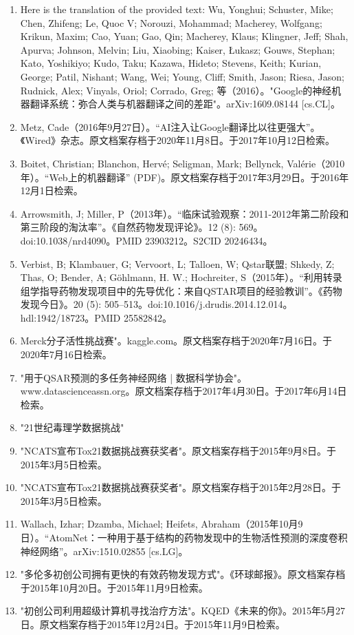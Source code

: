 \begin{enumerate}
\item Here is the translation of the provided text:
Wu, Yonghui; Schuster, Mike; Chen, Zhifeng; Le, Quoc V; Norouzi, Mohammad; Macherey, Wolfgang; Krikun, Maxim; Cao, Yuan; Gao, Qin; Macherey, Klaus; Klingner, Jeff; Shah, Apurva; Johnson, Melvin; Liu, Xiaobing; Kaiser, Łukasz; Gouws, Stephan; Kato, Yoshikiyo; Kudo, Taku; Kazawa, Hideto; Stevens, Keith; Kurian, George; Patil, Nishant; Wang, Wei; Young, Cliff; Smith, Jason; Riesa, Jason; Rudnick, Alex; Vinyals, Oriol; Corrado, Greg; 等（2016）。"Google的神经机器翻译系统：弥合人类与机器翻译之间的差距"。arXiv:1609.08144 [cs.CL]。
\item Metz, Cade（2016年9月27日）。“AI注入让Google翻译比以往更强大”。《Wired》杂志。原文档案存档于2020年11月8日。于2017年10月12日检索。
\item Boitet, Christian; Blanchon, Hervé; Seligman, Mark; Bellynck, Valérie（2010年）。“Web上的机器翻译” (PDF)。原文档案存档于2017年3月29日。于2016年12月1日检索。
\item Arrowsmith, J; Miller, P（2013年）。“临床试验观察：2011-2012年第二阶段和第三阶段的淘汰率”。《自然药物发现评论》。12 (8): 569。doi:10.1038/nrd4090。PMID 23903212。S2CID 20246434。
\item Verbist, B; Klambauer, G; Vervoort, L; Talloen, W; Qstar联盟; Shkedy, Z; Thas, O; Bender, A; Göhlmann, H. W.; Hochreiter, S（2015年）。“利用转录组学指导药物发现项目中的先导优化：来自QSTAR项目的经验教训”。《药物发现今日》。20 (5): 505–513。doi:10.1016/j.drudis.2014.12.014。hdl:1942/18723。PMID 25582842。
\item Merck分子活性挑战赛"。kaggle.com。原文档案存档于2020年7月16日。于2020年7月16日检索。
\item "用于QSAR预测的多任务神经网络 | 数据科学协会"。www.datascienceassn.org。原文档案存档于2017年4月30日。于2017年6月14日检索。
\item "21世纪毒理学数据挑战"
\item "NCATS宣布Tox21数据挑战赛获奖者"。原文档案存档于2015年9月8日。于2015年3月5日检索。
\item "NCATS宣布Tox21数据挑战赛获奖者"。原文档案存档于2015年2月28日。于2015年3月5日检索。
\item Wallach, Izhar; Dzamba, Michael; Heifets, Abraham（2015年10月9日）。“AtomNet：一种用于基于结构的药物发现中的生物活性预测的深度卷积神经网络”。arXiv:1510.02855 [cs.LG]。
\item "多伦多初创公司拥有更快的有效药物发现方式"。《环球邮报》。原文档案存档于2015年10月20日。于2015年11月9日检索。
\item "初创公司利用超级计算机寻找治疗方法"。KQED《未来的你》。2015年5月27日。原文档案存档于2015年12月24日。于2015年11月9日检索。

\end{enumerate}
